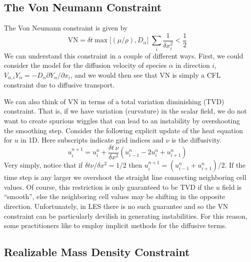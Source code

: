\subsection{The Von Neumann Constraint}

The Von Neumann constraint is given by
\begin{equation}
\mbox{VN} = \delta t \max \big[(\mu/\rho),D_\alpha \big] \; \sum_i \frac{1}{\delta x_i^2} < \frac{1}{2}
\end{equation}
We can understand this constraint in a couple of different ways.  First, we could consider the model for the diffusion velocity of species $\alpha$ in direction $i$, $V_{\alpha,i}Y_\alpha = -D_\alpha \partial Y_\alpha/\partial x_i$, and we would then see that VN is simply a CFL constraint due to diffusive transport.

We can also think of VN in terms of a total variation diminishing (TVD) constraint.  That is, if we have variation (curvature) in the scalar field, we do not want to create spurious wiggles that can lead to an instability by overshooting the smoothing step.  Consider the following explicit update of the heat equation for $u$ in 1D. Here subscripts indicate grid indices and $\nu$ is the diffusivity.
\begin{equation}
u_i^{n+1} = u_i^n + \frac{\delta t \, \nu}{\delta x^2} \left( u_{i-1}^n - 2u_i^n + u_{i+1}^n \right)
\end{equation}
Very simply, notice that if $\delta t \nu/\delta x^2 = 1/2$ then $u_i^{n+1} = (u_{i-1}^n + u_{i+1}^n)/2$.  If the time step is any larger we overshoot the straight line connecting neighboring cell values.  Of course, this restriction is only guaranteed to be TVD if the $u$ field is ``smooth'', else the neighboring cell values may be shifting in the opposite direction.  Unfortunately, in LES there is no such guarantee and so the VN constraint can be particularly devilish in generating instabilities. For this reason, some practitioners like to employ implicit methods for the diffusive terms.

\subsection{Realizable Mass Density Constraint}

